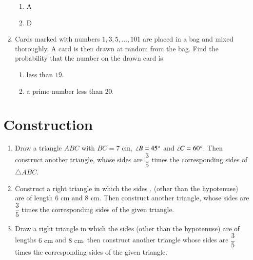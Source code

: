 \documentclass[journal,12pt,onecolumn]{IEEEtran}
\theoremstyle{remark}
\begin{document}
\begin{enumerate}
\begin{figure}[ht]
\begin{tikzpicture}[scale = 5]
\end{tikzpicture}
\end{figure}
\begin{enumerate}[label=\Roman*.]
\item A\\
\item D\\
\end{enumerate}
\item Cards marked with numbers $1,3,5, \ldots, 101$ are placed in a bag and mixed thoroughly. A card is then drawn at random from the bag. Find the probability that the number on the drawn card is 
\begin{enumerate}[label=\Roman*.]
\item less than $19$.
\item a prime number less than $20$.\\
\end{enumerate}
\end{enumerate}
\section{Construction}
\begin{enumerate}
\item Draw a triangle $ABC$ with $BC = 7 \text{ cm}$, $\angle B = 45 \degree$ and $\angle C = 60 \degree$. Then construct another triangle, whose sides are $\dfrac{3}{5}$ times the corresponding sides of $\triangle ABC$.\\
\item Construct a right triangle in which the sides , (other than the hypotenuse) are of length $6\text{ cm}$ and $8\text{ cm}$. Then construct another triangle, whose sides are $\dfrac{3}{5}$ times the corresponding sides of the given triangle.\\
\item Draw a right triangle in which the sides (other than the hypotenuse) are of lengths $6\text{ cm}$ and $8\text{ cm}$. then construct another triangle whose sides are $\dfrac{3}{5}$ times the corresponding sides of the given triangle.\\
\end{enumerate}
\end{document}
